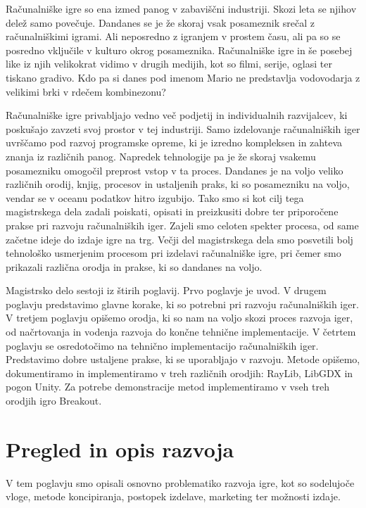 \documentclass[12pt,a4paper,twoside]{book}
\begin{document}
Računalniške igre so ena izmed panog v zabaviščni industriji. Skozi leta se njihov delež samo povečuje. Dandanes se je že skoraj vsak posameznik srečal z računalniškimi igrami. Ali neposredno z igranjem v prostem času, ali pa so se posredno vključile v kulturo okrog posameznika. Računalniške igre in še posebej like iz njih velikokrat vidimo v drugih medijih, kot so filmi, serije, oglasi ter tiskano gradivo. Kdo pa si danes pod imenom Mario ne predstavlja vodovodarja z velikimi brki v rdečem kombinezonu?

Računalniške igre privabljajo vedno več podjetij in individualnih razvijalcev, ki poskušajo zavzeti svoj prostor v tej industriji. Samo izdelovanje računalniških iger uvrščamo pod razvoj programske opreme, ki je izredno kompleksen in zahteva znanja iz različnih panog. Napredek tehnologije pa je že skoraj vsakemu posamezniku omogočil preprost vstop v ta proces. Dandanes je na voljo veliko različnih orodij, knjig, procesov in ustaljenih praks, ki so posamezniku na voljo, vendar se v oceanu podatkov hitro izgubijo. Tako smo si kot cilj tega magistrskega dela zadali poiskati, opisati in preizkusiti dobre ter priporočene prakse pri razvoju računalniških iger. Zajeli smo celoten spekter procesa, od same začetne ideje do izdaje igre na trg. Večji del magistrskega dela smo posvetili bolj tehnološko usmerjenim procesom pri izdelavi računalniške igre, pri čemer smo prikazali različna orodja in prakse, ki so dandanes na voljo.

Magistrsko delo sestoji iz štirih poglavij. Prvo poglavje je uvod. V drugem poglavju predstavimo glavne korake, ki so potrebni pri razvoju računalniških iger. V tretjem poglavju opišemo orodja, ki so nam na voljo skozi proces razvoja iger, od načrtovanja in vodenja razvoja do končne tehnične implementacije. V četrtem poglavju se osredotočimo na tehnično implementacijo računalniških iger. Predstavimo dobre ustaljene prakse, ki se uporabljajo v razvoju. Metode opišemo, dokumentiramo in implementiramo v treh različnih orodjih: RayLib, LibGDX in pogon Unity. Za potrebe demonstracije metod implementiramo v vseh treh orodjih igro Breakout.

\chapter{Pregled in opis razvoja}\thispagestyle{fancy}
V tem poglavju smo opisali osnovno problematiko razvoja igre, kot so sodelujoče vloge, metode koncipiranja, postopek izdelave, marketing ter možnosti izdaje.
\end{document}
